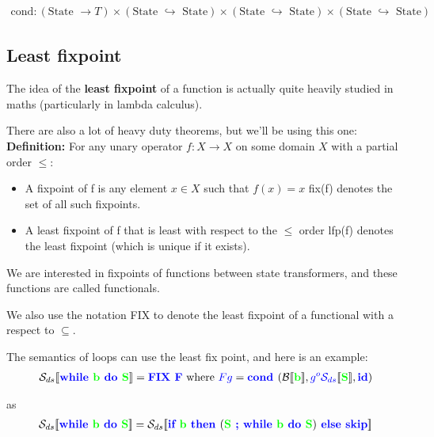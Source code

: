 \documentclass[11pt,a4paper,headsepline,titlepage,dvipsnames,cmyk]{scrartcl}
\newcommand\pfun{\hookrightarrow}
\begin{document}
\begin{align*}
    \text{cond} : (\text{State } \rightarrow T) \times (\text{State }
    \pfun \text{ State}) \times (\text{State }
    \pfun \text{ State})\times (\text{State }
    \pfun \text{ State})
\end{align*}

\subsection{Least fixpoint}%
\label{sub:least-fixpoint}
The idea of the \textbf{least fixpoint} of a function is actually quite
heavily studied in maths (particularly in lambda calculus).

There are also a lot of heavy duty theorems, but we'll be using this one:
\textbf{Definition:} For any unary operator $f : X \rightarrow X$ on some
domain $X$ with a partial order $\le:$
\begin{itemize}
    \item A {\color{red}fixpoint} of f is any element $x \in X$ such that
        $f(x) = x$ {\color{green}fix(f)} denotes the set of all such
        fixpoints.
    \item A {\color{red}least} fixpoint of f that is least with respect
        to the $\le$ order {\color{green}lfp(f)} denotes the least
        fixpoint (which is unique if it exists).
\end{itemize}

We are interested in  fixpoints of functions between state transformers,
and these functions are called functionals.

We also use the notation {\color{red}FIX} to denote the least fixpoint of
a functional with a respect to $\subseteq$.

The semantics of loops can use the least fix point, and here is an
example:
\begin{align*}
    \mathcal{S}_{ds}[\![ {\color{blue}\textbf{while }} {\color{green}
    \textbf{b }} {\color{blue} \textbf{do }} {\color{green} \textbf{S}}
    ]\!] =
    {\color{blue} \textbf{FIX F}} \text{ where } {\color{blue}F g} =
    {\color{blue} \textbf{cond }} (\mathcal{B} [\![ {\color{green}
    \textbf{b}} ]\!], {\color{blue} g ^o \mathcal{S}_{ds}} [\![
    {\color{green} \textbf{S}} ]\!], {\color{blue} \textbf{id}})
\end{align*}

as
\begin{align*}
    \mathcal{S}_{ds}[\![ {\color{blue}\textbf{while }} {\color{green}
    \textbf{b }} {\color{blue} \textbf{do }} {\color{green} \textbf{S}}
    ]\!] =\mathcal{S}_{ds}[\![ {\color{blue} \textbf{if }} {\color{green}
    \textbf{b }} {\color{blue} \textbf{then }} ( {\color{green} \textbf{S
}} {\color{blue} \textbf{; while }} {\color{green} \textbf{b }}
{\color{blue} \textbf{do }} {\color{green} \textbf{S}}) {\color{blue}
\textbf{ else skip}} ]\!]
\end{align*}
\end{document}
